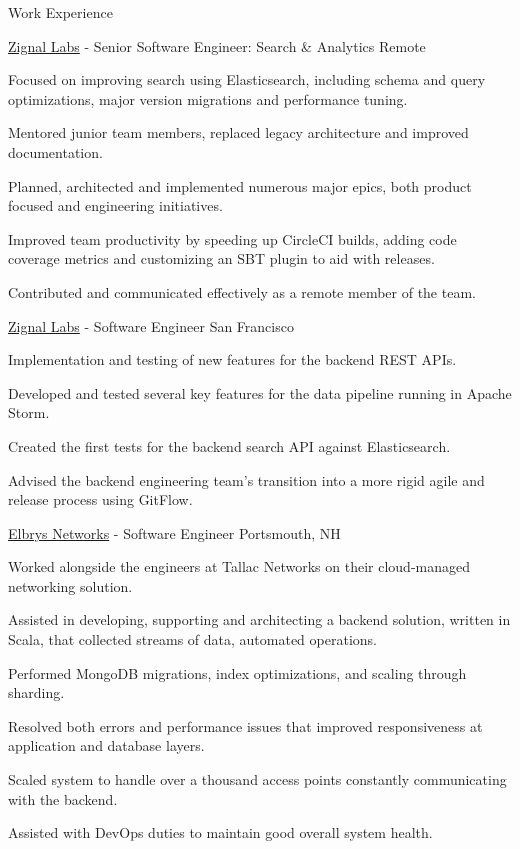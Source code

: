 \documentclass[UKenglish]{resume} %
\begin{document}
\begin{rSection}{Work Experience}
    \begin{rSubsection}
        {\href{https://www.zignallabs.com}{Zignal Labs}}
        {  -  }
        {Senior Software Engineer: Search \& Analytics }
        {Remote}
        \item Focused on improving search using Elasticsearch, including schema and query optimizations, major version migrations and performance tuning.
        \item Mentored junior team members, replaced legacy architecture and improved documentation.
        \item Planned, architected and implemented numerous major epics, both product focused and engineering initiatives.
        \item Improved team productivity by speeding up CircleCI builds, adding code coverage metrics and customizing an SBT plugin to aid with releases.
        \item Contributed and communicated effectively as a remote member of the team.
    \end{rSubsection}

    \begin{rSubsection}
        {\href{https://www.zignallabs.com}{Zignal Labs}}
        {  -  }
        {Software Engineer}
        {San Francisco}
        \item Implementation and testing of new features for the backend REST APIs.
        \item Developed and tested several key features for the data pipeline running in Apache Storm.
        \item Created the first tests for the backend search API against Elasticsearch.
        \item Advised the backend engineering team's transition into a more rigid agile and release process using GitFlow.
    \end{rSubsection}


    \begin{rSubsection}
        {\href{}{Elbrys Networks}}
        {  -  }
        {Software Engineer}
        {Portsmouth, NH}

        \item Worked alongside the engineers at Tallac Networks on their cloud-managed networking solution. 
        \item Assisted in developing, supporting and architecting a backend solution, written in Scala, that collected streams of data, automated operations.
        \item Performed MongoDB migrations, index optimizations, and scaling through sharding.
        \item Resolved both errors and performance issues that improved responsiveness at application and database layers.
        \item Scaled system to handle over a thousand access points constantly communicating with the backend.
        \item Assisted with DevOps duties to maintain good overall system health.


\end{rSubsection}
\end{rSection}
\end{document}
